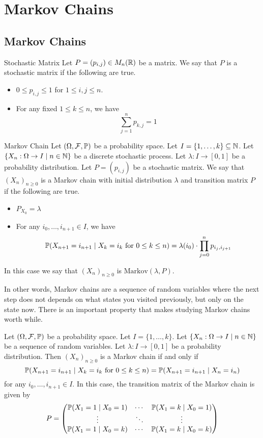 \documentclass[a4paper]{article}
\begin{document}
\pagebreak
\section{Markov Chains}
\subsection{Markov Chains}
\begin{defn}{Stochastic Matrix}{} Let $P=(p_{i,j})\in M_n(\mathbb{R})$ be a matrix. We say that $P$ is a stochastic matrix if the following are true. 
\begin{itemize}
\item $0\leq p_{i,j}\leq 1$ for $1\leq i,j\leq n$. 
\item For any fixed $1\leq k\leq n$, we have $$\sum_{j=1}^np_{k,j}=1$$
\end{itemize}
\end{defn}

\begin{defn}{Markov Chain}{} Let $(\Omega,\mathcal{F},\mathbb{P})$ be a probability space. Let $I=\{1,\dots,k\}\subseteq\mathbb{N}$. Let $\{X_n:\Omega\to I\;|\;n\in\mathbb{N}\}$ be a discrete stochastic process. Let $\lambda:I\to[0,1]$ be a probability distribution. Let $P=(p_{i,j})$ be a stochastic matrix. We say that $(X_n)_{n\geq 0}$ is a Markov chain with initial distribution $\lambda$ and transition matrix $P$ if the following are true. 
\begin{itemize}
\item $P_{X_0}=\lambda$
\item For any $i_0,\dots,i_{n+1}\in I$, we have $$\mathbb{P}(X_{n+1}=i_{n+1}\;|\;X_k=i_k\text{ for }0\leq k\leq n)=\lambda(i_0)\cdot\prod_{j=0}^n p_{i_j,i_{j+1}}$$ 
\end{itemize}
In this case we say that $(X_n)_{n\geq 0}$ is $\text{Markov}(\lambda,P)$. 
\end{defn}

In other words, Markov chains are a sequence of random variables where the next step does not depends on what states you visited previously, but only on the state now. There is an important property that makes studying Markov chains worth while. 

\begin{prp}{}{} Let $(\Omega,\mathcal{F},\mathbb{P})$ be a probability space. Let $I=\{1,\dots,k\}$. Let $\{X_n:\Omega\to I\;|\;n\in\mathbb{N}\}$ be a sequence of random variables. Let $\lambda:I\to[0,1]$ be a probability distribution. Then $(X_n)_{n\geq 0}$ is a Markov chain if and only if $$\mathbb{P}(X_{n+1}=i_{n+1}\;|\;X_k=i_k\text{ for }0\leq k\leq n)=\mathbb{P}(X_{n+1}=i_{n+1}\;|\;X_n=i_n)$$ for any $i_0,\dots,i_{n+1}\in I$. In this case, the transition matrix of the Markov chain is given by $$P=\begin{pmatrix}
\mathbb{P}(X_1=1\;|\;X_0=1) & \cdots & \mathbb{P}(X_1=k\;|\;X_0=1)\\
\vdots & \ddots & \vdots\\
\mathbb{P}(X_1=1\;|\;X_0=k) & \cdots & \mathbb{P}(X_1=k\;|\;X_0=k)
\end{pmatrix}$$
\end{prp}
\end{document}
